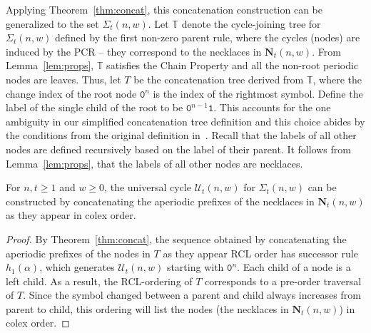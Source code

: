 \documentclass[US-letter,USenglish,authorcolumns,autoref]{lipics-v2021}
\renewcommand{\tt} {\mathtt}
\newcommand{\bN}{\mathbf{N}}
\begin{document}
%
Applying Theorem~\ref{thm:concat}, this concatenation construction can be generalized to the set $\Sigma_t(n,w)$.  
%
Let $\mathbb{T}$ denote the cycle-joining tree for $\Sigma_t(n,w)$ defined by the first non-zero parent rule, where the cycles (nodes) are induced by the PCR -- they correspond to the necklaces in $\bN_t(n,w)$.  
From Lemma~\ref{lem:props}, $\mathbb{T}$ satisfies the Chain Property and all the non-root periodic nodes are leaves.  Thus, let $T$ be the concatenation tree derived from $\mathbb{T}$, where the change index of the root node $\tt{0}^n$ is the index of the rightmost symbol. Define the label of the single child of the root to be $\tt{0}^{n-1}\tt{1}$. This accounts for the one ambiguity in our simplified concatenation tree definition and this choice abides by the conditions from the original definition in~\cite{concattree}.  Recall that the labels of all other nodes are defined recursively based on the label of their parent.  It follows from Lemma~\ref{lem:props}, that the labels of all other nodes are necklaces.  


\begin{theorem} \label{thm:main}
For $n,t \geq 1$ and $w \geq 0$, the universal cycle $\mathcal{U}_t(n,w)$ for $\Sigma_t(n,w)$ can be constructed by concatenating the aperiodic prefixes of the necklaces in $\bN_t(n,w)$ as they appear in colex order. 
\end{theorem}
%
\begin{proof}
By Theorem~\ref{thm:concat}, the sequence obtained by concatenating the aperiodic prefixes of the nodes in $T$ as they appear RCL order has successor rule $h_1(\alpha)$, which generates $\mathcal{U}_t(n,w)$ starting with $\tt{0}^n$. 
Each child of a node is a left child.  As a result, the RCL-ordering of $T$ corresponds to a pre-order traversal of $T$.  Since the symbol changed between a parent and child always increases from parent to child, this ordering will list the nodes (the necklaces in $\bN_t(n,w)$) in colex order.    %
%
\end{proof}
\end{document}
